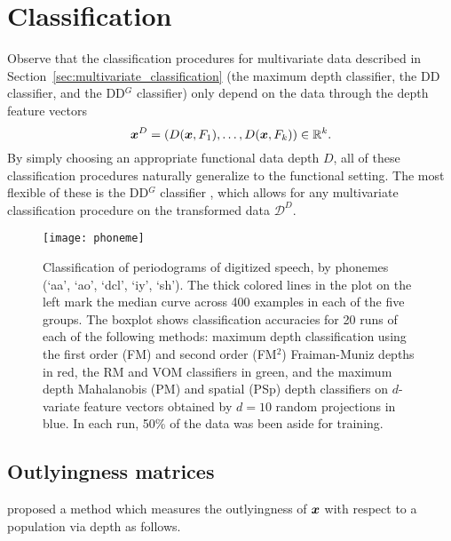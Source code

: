 \section{Classification}

Observe that the classification procedures for multivariate data described in
Section~\ref{sec:multivariate_classification} (the maximum depth classifier,
the DD classifier, and the DD$^G$ classifier) only depend on the data through
the depth feature vectors
\begin{equation}
    \bm{x}^D = (D(\bm{x}, F_1), \dots, D(\bm{x}, F_k)) \in \mathbb{R}^k.
\end{equation}
By simply choosing an appropriate functional data depth $D$, all of these
classification procedures naturally generalize to the functional setting.
The most flexible of these is the DD$^G$ classifier
\parencite{albertos-bande-fuente-2017}, which allows for any multivariate
classification procedure on the transformed data $\mathscr{D}^D$.



\begin{figure}
    \centering
    \texttt{[image: phoneme]}
    \caption{
        Classification of periodograms of digitized
        speech\protect\footnotemark, by phonemes (`aa', `ao', `dcl', `iy',
        `sh').
        The thick colored lines in the plot on the left mark the median curve
        across 400 examples in each of the five groups.
        The boxplot shows classification accuracies for 20 runs of each of the
        following methods: maximum depth classification using the first order
        (FM) and second order (FM$^2$) Fraiman-Muniz depths in red, the RM and
        VOM classifiers in green, and the maximum depth Mahalanobis (PM) and
        spatial (PSp) depth classifiers on $d$-variate feature vectors
        obtained by $d = 10$ random projections in blue.
        In each run, 50\% of the data was been aside for training.
    }
    \label{fig:phoneme_classification}
\end{figure}



\subsection{Outlyingness matrices}

\textcite{dai-genton-2018} proposed a method which measures the outlyingness
of $\bm{x}$ with respect to a population via depth as follows.


